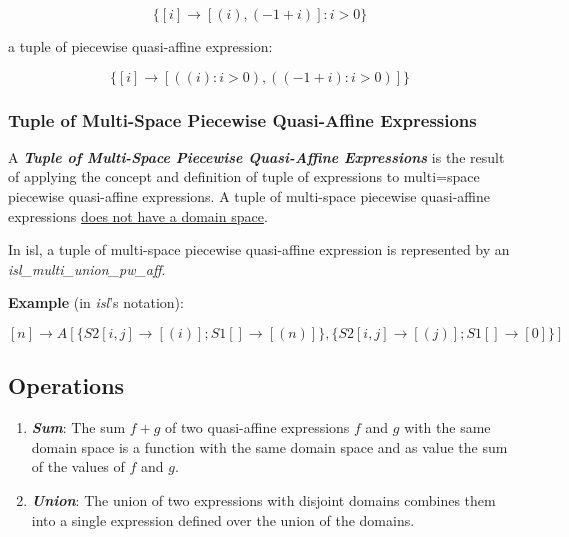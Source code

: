 $$\{[i]\rightarrow [(i), (-1 + i)] : i > 0\}$$

a tuple of piecewise quasi-affine expression:

$$\{ [i] \rightarrow [((i) : i>0), ((-1 + i): i > 0)]\}$$

\subsubsection{Tuple of Multi-Space Piecewise Quasi-Affine Expressions}

A \textcolor{vr}{\textbf{\emph{Tuple of Multi-Space Piecewise Quasi-Affine Expressions}}} is the result of applying the concept and definition of tuple of expressions to multi=space piecewise quasi-affine expressions. A tuple of multi-space piecewise quasi-affine expressions \underline{does not have a domain space}.

In isl, a tuple of multi-space piecewise quasi-affine expression is represented by an \textcolor{pg}{\emph{isl\_multi\_union\_pw\_aff}}.

\textbf{Example} (in \emph{isl}'s notation):

$$[n] \rightarrow A[\{S2[i,j] \rightarrow [(i)]; S1[] \rightarrow [(n)]\},
\{ S2[i,j] \rightarrow [(j)]; S1[] \rightarrow [0] \}]$$

\subsection{Operations}

\begin{enumerate}
  \item \textcolor{vr}{\textbf{\emph{Sum}}}: The sum $f+g$ of two quasi-affine expressions $f$ and $g$ with the same domain space is a function with the same domain space and as value the sum of the values of $f$ and $g$.
  \item \textcolor{vr}{\textbf{\emph{Union}}}: The union of two expressions with disjoint domains combines them into a single expression defined over the union of the domains.
\end{enumerate}
